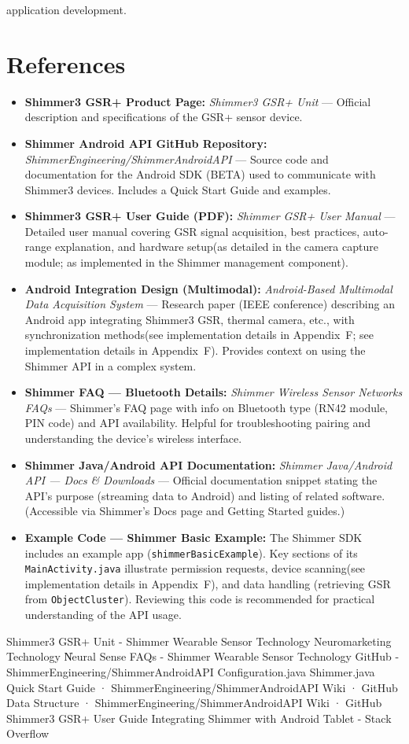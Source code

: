 application development. \section{References} \begin{itemize} \item \textbf{Shimmer3 GSR+ Product Page:} \textit{Shimmer3 GSR+ Unit} --- Official description and specifications of the GSR+ sensor device. \item \textbf{Shimmer Android API GitHub Repository:} \textit{ShimmerEngineering/ShimmerAndroidAPI} --- Source code and documentation for the Android SDK (BETA) used to communicate with Shimmer3 devices. Includes a Quick Start Guide and examples. \item \textbf{Shimmer3 GSR+ User Guide (PDF):} \textit{Shimmer GSR+ User Manual} --- Detailed user manual covering GSR signal acquisition, best practices, auto-range explanation, and hardware setup(as detailed in the camera capture module; as implemented in the Shimmer management component). \item \textbf{Android Integration Design (Multimodal):} \textit{Android-Based Multimodal Data Acquisition System} --- Research paper (IEEE conference) describing an Android app integrating Shimmer3 GSR, thermal camera, etc., with synchronization methods(see implementation details in Appendix~F; see implementation details in Appendix~F). Provides context on using the Shimmer API in a complex system. \item \textbf{Shimmer FAQ --- Bluetooth Details:} \textit{Shimmer Wireless Sensor Networks FAQs} --- Shimmer's FAQ page with info on Bluetooth type (RN42 module, PIN code) and API availability. Helpful for troubleshooting pairing and understanding the device's wireless interface. \item \textbf{Shimmer Java/Android API Documentation:} \textit{Shimmer Java/Android API --- Docs & Downloads} --- Official documentation snippet stating the API's purpose (streaming data to Android) and listing of related software. (Accessible via Shimmer's Docs page and Getting Started guides.) \item \textbf{Example Code --- Shimmer Basic Example:} The Shimmer SDK includes an example app (\texttt{shimmerBasicExample}). Key sections of its \texttt{MainActivity.java} illustrate permission requests, device scanning(see implementation details in Appendix~F), and data handling (retrieving GSR from \texttt{ObjectCluster}). Reviewing this code is recommended for practical understanding of the API usage. \end{itemize} Shimmer3 GSR+ Unit - Shimmer Wearable Sensor Technology Neuromarketing Technology \| Neural Sense FAQs - Shimmer Wearable Sensor Technology GitHub - ShimmerEngineering/ShimmerAndroidAPI Configuration.java Shimmer.java Quick Start Guide · ShimmerEngineering/ShimmerAndroidAPI Wiki · GitHub Data Structure · ShimmerEngineering/ShimmerAndroidAPI Wiki · GitHub Shimmer3 GSR+ User Guide Integrating Shimmer with Android Tablet - Stack Overflow 